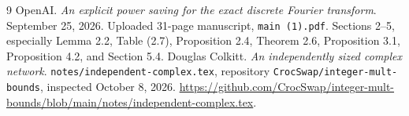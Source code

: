 \documentclass[11pt]{article}
\begin{document}
\begin{thebibliography}{9}
 OpenAI. \emph{An explicit power saving for the exact discrete Fourier transform}. September 25, 2026. Uploaded 31-page manuscript, \texttt{main (1).pdf}. Sections 2--5, especially Lemma 2.2, Table (2.7), Proposition 2.4, Theorem 2.6, Proposition 3.1, Proposition 4.2, and Section 5.4.
 Douglas Colkitt. \emph{An independently sized complex network}. \texttt{notes/independent-complex.tex}, repository \texttt{CrocSwap/integer-mult-bounds}, inspected October 8, 2026. \url{https://github.com/CrocSwap/integer-mult-bounds/blob/main/notes/independent-complex.tex}.
\end{thebibliography}
\end{document}
